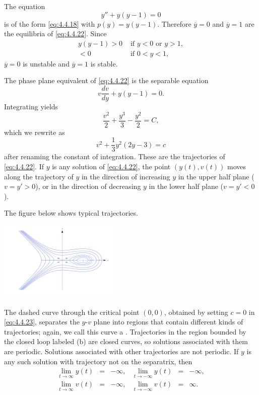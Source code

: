\documentclass{ximera}
\begin{document}
 
\begin{example} \label{example:4.4.3}
The equation
\begin{equation} \label{eq:4.4.22}
y''+y(y-1)=0
\end{equation}
is of the form \eqref{eq:4.4.18} with $p(y)=y(y-1)$. Therefore $\overline{y}=0$ and $\overline{y}=1$ are the equilibria of \eqref{eq:4.4.22}. Since
\begin{eqnarray*}
y(y-1)>0 &\mbox{ if } y<0\mbox{ or }y>1,\\
<0&\mbox{ if } 0<y<1,
\end{eqnarray*}
$\overline{y}=0$ is unstable and $\overline{y}=1$ is
stable.
 
The phase plane equivalent of \eqref{eq:4.4.22} is the separable equation
$$
v\frac{dv}{dy}+y(y-1)=0.
$$
Integrating yields
$$
\frac{v^2}{2}+\frac{y^3}{3}-\frac{y^2}{2}=C,
$$
which we rewrite  as
\begin{equation} \label{eq:4.4.23}
v^2+\frac{1}{3}y^2(2y-3)=c
\end{equation}
after renaming the constant of integration. These are the trajectories
of \eqref{eq:4.4.22}. If $y$ is any solution of \eqref{eq:4.4.22},  the
point $(y(t),v(t))$ moves along the trajectory of $y$ in the direction
of increasing $y$ in the upper half plane ($v=y'>0$), or in the
direction of decreasing $y$ in the lower half plane ($v=y'<0$).
 
The figure below shows
typical trajectories.
 
\begin{image}
 \includegraphics[height=1.5in]{fig040410.jpg}
\end{image}
 
 
The
dashed curve through the critical point $(0,0)$, obtained by setting
$c=0$ in \eqref{eq:4.4.23}, separates the $y$-$v$ plane into regions
that contain different kinds of trajectories; again,
 we call this curve a .
Trajectories in the region bounded by the closed loop labeled (b) are closed
curves,
so solutions associated with them are periodic. Solutions associated
with other trajectories are not periodic. If $y$ is any such solution
with trajectory not  on the separatrix, then
$$
\begin{array}{llrllr}
\lim_{t\rightarrow\infty}y(t)&=&-\infty, &\lim_{t\rightarrow-\infty}y(t)&=&-\infty,\\
\lim_{t\rightarrow\infty}v(t)&=&-\infty,
&\lim_{t\rightarrow-\infty}v(t)&=&\infty.
\end{array}
$$
 

\end{example}
\end{document}
